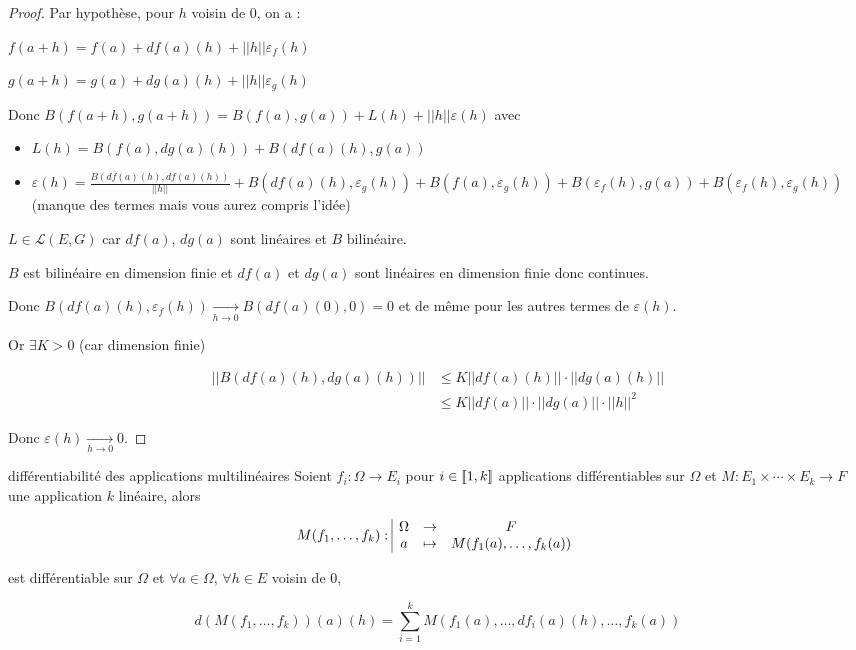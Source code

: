 \begin{proof}
    Par hypothèse, pour $h$ voisin de $0$, on a : 
    
    $f(a + h) = f(a) + df(a)(h) + ||h|| \varepsilon_f(h)$

    $g(a + h) = g(a) + dg(a)(h) + ||h|| \varepsilon_g(h)$

    \svspace

    Donc $B(f(a + h), g(a + h)) = B(f(a), g(a)) + L(h) + ||h|| \varepsilon (h)$ avec

    \begin{itemize}
        \item $L(h) = B(f(a), dg(a)(h)) + B(df(a)(h), g(a))$
        \item $\varepsilon (h) = \frac{B(df(a)(h), df(a)(h))}{||h||} + B(df(a)(h), \varepsilon_g(h)) + B(f(a), \varepsilon_g(h)) + B(\varepsilon_f(h), g(a)) + B(\varepsilon_f(h), \varepsilon_g(h))$ (manque des termes mais vous aurez compris l'idée)
    \end{itemize}

    $L \in \mathscr L(E, G)$ car $df(a)$, $dg(a)$ sont linéaires et $B$ bilinéaire.

    $B$ est bilinéaire en dimension finie et $df(a)$ et $dg(a)$ sont linéaires en dimension finie 
    donc continues. 

    Donc $\displaystyle B(df(a)(h), \varepsilon_f(h)) \xrightarrow[h \to 0 ]{} B(df(a)(0), 0) = 0$ et de même pour les autres termes de $\varepsilon(h)$.

    Or $\exists K > 0$ (car dimension finie) 

    \begin{align}
        ||B(df(a)(h), dg(a)(h))|| & \leqslant K ||df(a)(h)|| \cdot ||dg(a)(h)|| \\
        & \leqslant K ||df(a)|| \cdot ||dg(a)|| \cdot ||h||^2
    \end{align}

    Donc $\varepsilon (h) \xrightarrow[h \to 0 ]{} 0$.
\end{proof}

\begin{proposition}{différentiabilité des applications multilinéaires}{}
    Soient $f_i : \Omega \to E_i$ pour $i \in [\![1, k]\!]$ applications différentiables sur 
    $\Omega$ et $M : E_1 \times \cdots \times E_k \to F$ une application $k$ linéaire, alors 
    
    $$M(f_1, \ldots, f_k): \space \begin{array}{|ccc} \displaystyle \Omega & \to & \displaystyle F \\ \displaystyle a & \mapsto & \displaystyle M(f_1(a), \ldots, f_k(a)) \end{array}$$
    
    est différentiable sur $\Omega$ et
    $\forall a \in \Omega$, $\forall h \in E$ voisin de $0$, 

    $$d(M(f_1, \ldots, f_k))(a)(h) = \sum_{i = 1 }^{k } M(f_1(a), \ldots, df_i(a)(h), \ldots, f_k(a))$$
\end{proposition}

